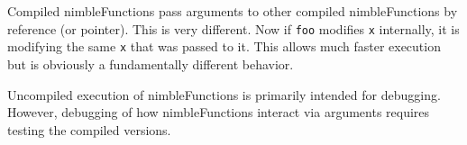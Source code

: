 \documentclass[12pt,oneside]{book}\usepackage[]{graphicx}\usepackage[]{color}
\def\cd#1{\texttt{#1}}
\begin{document}
Compiled nimbleFunctions pass arguments to other compiled
nimbleFunctions by reference (or pointer).  This is very different.
Now if \cd{foo} modifies \cd{x} internally, it is modifying the same
\cd{x} that was passed to it.  This allows much faster execution but
  is obviously a fundamentally different behavior.
  
  Uncompiled execution of nimbleFunctions is primarily intended for
  debugging.  However, debugging of how nimbleFunctions interact via
  arguments requires testing the compiled versions.
  





  


  
\end{document}
